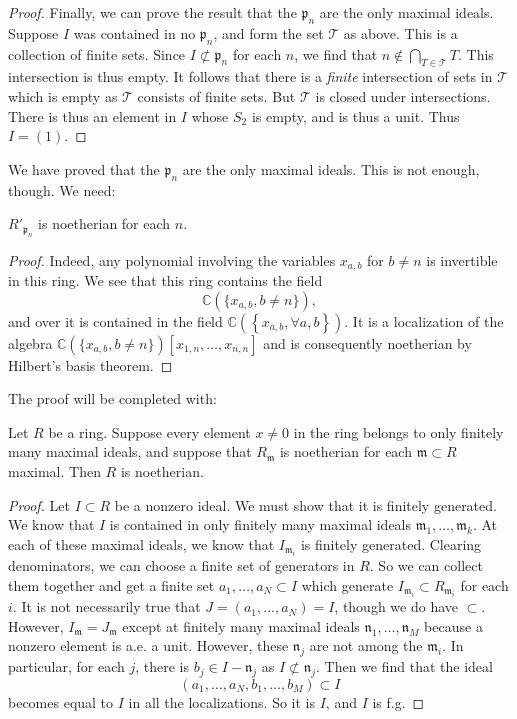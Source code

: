 \begin{proof}
Finally, we can prove the result that the $\mathfrak{p}_n$ are the only maximal
ideals. Suppose $I$ was contained in no $\mathfrak{p}_n$, and form the set
$\mathcal{T}$ as above. This is a collection of finite sets. Since $I
\not\subset \mathfrak{p}_n$ for each $n$, we find that $n \notin \bigcap_{T \in
\mathcal{T}} T$. This intersection is thus empty. It follows that there is a
\emph{finite} intersection of sets in $\mathcal{T}$
which is empty as $\mathcal{T}$ consists of finite sets. But $\mathcal{T}$ is closed under intersections. There is thus
an element in $I$ whose $S_2$ is empty, and is thus a unit. Thus $I = (1)$.
\end{proof} 

We have proved that the $\mathfrak{p}_n$ are the only maximal ideals. This is
not enough, though. We need:
\begin{lemma} 
$R'_{\mathfrak{p}_n}$ is noetherian for each $n$. 
\end{lemma} 
\begin{proof} 
Indeed, any polynomial involving the variables $x_{a,b}$ for $ b \neq n$ is
invertible in this ring. We see that this ring contains the field
\[ \mathbb{C}(\{x_{a,b}, b \neq n\}),  \]
and over it is contained in the field $\mathbb{C}(\left\{x_{a,b}, \forall
a,b\right\})$. It is a localization of the algebra $\mathbb{C}(\{x_{a,b}, b
\neq n\})[x_{1,n} , \dots, x_{n,n}]$ and is consequently noetherian by
Hilbert's basis theorem.
\end{proof} 

The proof will be completed with:
\begin{lemma} 
Let $R$ be a ring. Suppose every element $x \neq 0$ in the ring belongs to only
finitely many maximal ideals, and suppose that $R_{\mathfrak{m}}$ is noetherian
for each $\mathfrak{m} \subset R$ maximal. Then $R$ is noetherian. 
\end{lemma} 
\begin{proof} 
Let $I \subset R$ be a nonzero ideal. We must show that it is finitely generated. We
know that $I$ is contained in only finitely many maximal ideals $\mathfrak{m}_1
, \dots , \mathfrak{m}_k$. 
At each of these maximal ideals, we know that $I_{\mathfrak{m}_i}$ is finitely
generated. Clearing denominators, we can choose a finite set of generators in
$R$. So we can collect them together and get a finite set $a_1, \dots, a_N
\subset I$
which generate $I_{\mathfrak{m}_i} \subset R_{\mathfrak{m}_i}$ for each $i$. It
is not necessarily true that $J = (a_1, \dots, a_N) = I$, though we do have
$\subset$. However, $I_{\mathfrak{m}} = J_{\mathfrak{m}}$ except at finitely
many maximal ideals $\mathfrak{n}_1, \dots, \mathfrak{n}_M$ because a nonzero
element is a.e. a unit. However, these $\mathfrak{n}_j$ are not among the
$\mathfrak{m}_i$. In particular, for each $j$, there is $b_j \in I -
\mathfrak{n}_j$ as $I \not\subset \mathfrak{n}_j$. Then we find that the ideal
\[ (a_1, \dots, a_N, b_1, \dots, b_M) \subset I \]
becomes equal to $I$ in all the localizations. So it is $I$, and $I$ is f.g. 

\end{proof} 

